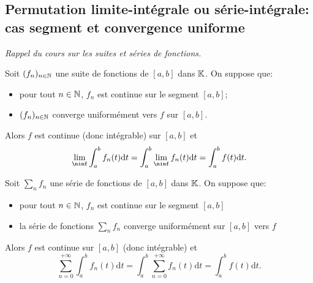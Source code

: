 \documentclass{book}
\begin{document}
\subsection{Permutation limite-intégrale ou série-intégrale: cas segment et convergence uniforme}
\textit{Rappel du cours sur les suites et séries de fonctions.}
\begin{Theoreme}
Soit $(f_n)_{n\in\mathbb{N}}$ une suite de fonctions de $[a,b]$ dans $\mathbb{K}$.
On suppose que:
\begin{itemize}
\item
  pour tout $n\in \mathbb{N} $, $f_n$ est continue sur le segment $[a,b]$;
\item
  $(f_n)_{n\in\mathbb{N}}$ converge uniformément vers $f$ sur $[a,b]$.
\end{itemize}

Alors $f$ est continue (donc intégrable) sur $[a,b]$ et
\[  \lim_\ninf \int_a^b f_n(t)\mathrm dt = \int_a^b \lim_\ninf f_n(t)\mathrm dt = \int_a^b f(t)\mathrm dt.  \]
\end{Theoreme}
\begin{Theoreme}
Soit $\sum_n f_n $ une série de fonctions de $[a,b]$ dans $\mathbb{K}$.
On suppose que:
\begin{itemize}
\item
  pour tout $n\in \mathbb{N} $, $f_n$ est continue sur le segment $[a,b]$
\item
  la série de fonctions $\sum_n f_n$ converge uniformément sur $[a,b]$ vers $f$
\end{itemize}
Alors $f$ est continue sur $[a,b]$ (donc intégrable) et
\[ \sum_{n=0}^{+\infty} \int_a^b f_n(t)\mathrm dt = \int_a^b \sum_{n=0}^{+\infty} f_n(t)\mathrm dt= \int_a^b f(t)\mathrm dt.   \]
\end{Theoreme}
\end{document}

